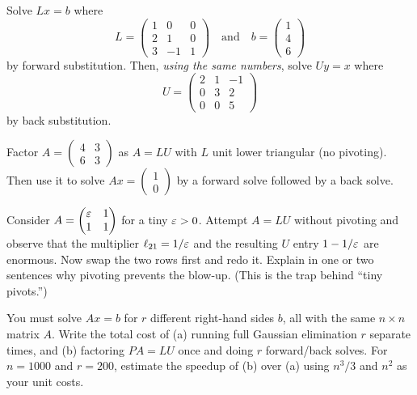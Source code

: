 \begin{exercise}
\label{ch27:ex-substitution}
Solve $Lx=b$ where
\[
L=\begin{pmatrix}1&0&0\\2&1&0\\3&-1&1\end{pmatrix} \quad \text{and} \quad
b=\begin{pmatrix}1\\ 4\\ 6\end{pmatrix}
\]
by forward substitution. Then,
\emph{using the same numbers}, solve $Uy=x$ where
\[
U=\begin{pmatrix}2&1&-1\\0&3&2\\0&0&5\end{pmatrix}
\]
by back substitution.
\end{exercise}

\begin{exercise}
\label{ch27:ex-lu}
Factor $A=\begin{pmatrix}4 & 3\\ 6 & 3\end{pmatrix}$ as $A=LU$ with $L$ unit lower
triangular (no pivoting). Then use it to solve $Ax=\begin{pmatrix}1\\ 0\end{pmatrix}$
by a forward solve followed by a back solve.
\end{exercise}

\begin{exercise}
\label{ch27:ex-pivot}
Consider $A=\begin{pmatrix}\varepsilon & 1\\ 1 & 1\end{pmatrix}$ for a tiny
$\varepsilon>0$. Attempt $A=LU$ without pivoting and observe that the multiplier
$\ell_{21}=1/\varepsilon$ and the resulting $U$ entry $1-1/\varepsilon$ are enormous. Now swap
the two rows first and redo it. Explain in one or two sentences why pivoting
prevents the blow-up. (This is the trap behind ``tiny pivots.'')
\end{exercise}

\begin{exercise}
\label{ch27:ex-many-solves}
You must solve $Ax=b$ for $r$ different right-hand sides $b$, all with the same
$n\times n$ matrix $A$. Write the total cost of (a) running full Gaussian
elimination $r$ separate times, and (b) factoring $PA=LU$ once and doing $r$
forward/back solves. For $n=1000$ and $r=200$, estimate the speedup of (b) over
(a) using $n^3/3$ and $n^2$ as your unit costs.
\end{exercise}

